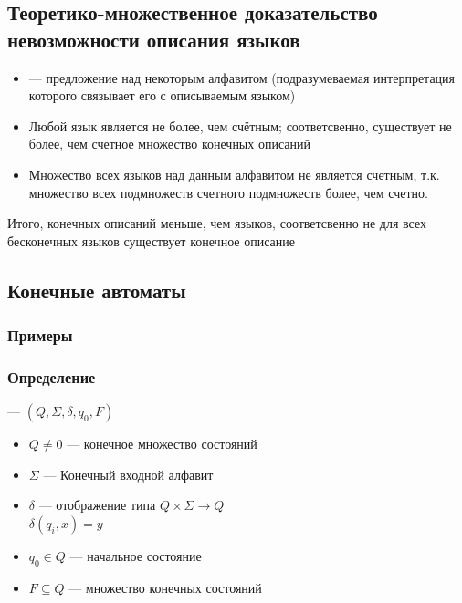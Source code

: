 \documentclass[a4paper, 14pt]{extarticle}
\begin{document}
\subsection{Теоретико-множественное доказательство невозможности описания языков}
\begin{itemize}
    \item {} --- предложение над некоторым алфавитом (подразумеваемая интерпретация которого связывает его с описываемым языком)

    \item Любой язык является не более, чем счётным; соответсвенно, существует не более, чем счетное множество конечных описаний

    \item Множество всех языков над данным алфавитом не является счетным, т.к. множество всех подмножеств счетного подмножеств более, чем счетно.

\end{itemize}
Итого, конечных описаний меньше, чем языков, соответсвенно не для всех бесконечных языков существует конечное описание

\subsection{Конечные автоматы}
\subsubsection{Примеры}

\subsubsection{Определение}
 --- $ ( Q, \Sigma, \delta, q_0, F ) $ 
\begin{itemize}
    \item $Q \ne 0$ --- конечное множество состояний 
    \item $\Sigma$ --- Конечный входной алфавит
    \item $\delta$ --- отображение типа $Q \times \Sigma \rightarrow Q$\\
    $\delta (q_i, x) = y$
    \item $q_0 \in Q$ --- начальное состояние
    \item $F \subseteq Q$ --- множество конечных состояний
\end{itemize}
\end{document}
